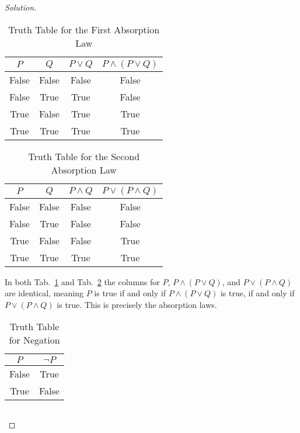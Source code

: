 \documentclass{article}
\theoremstyle{normal}
\begin{document}
\begin{proof}[Solution]
\begin{table}[H]
            \centering
            \begin{tabular}{ c | c | c | c }
                $P$&$Q$&$P\lor{Q}$&$P\land(P\lor{Q})$\\
                \hline
                False&False&False&False\\
                False&True&True&False\\
                True&False&True&True\\
                True&True&True&True
            \end{tabular}
            \caption{Truth Table for the First Absorption Law}
            \label{tab:first_abs_law}
        \end{table}
        \begin{table}[H]
            \centering
            \begin{tabular}{ c | c | c | c }
                $P$&$Q$&$P\land{Q}$&$P\lor(P\land{Q})$\\
                \hline
                False&False&False&False\\
                False&True&False&False\\
                True&False&False&True\\
                True&True&True&True
            \end{tabular}
            \caption{Truth Table for the Second Absorption Law}
            \label{tab:second_abs_law}
        \end{table}
        In both Tab.~\ref{tab:first_abs_law} and Tab.~\ref{tab:second_abs_law}
        the columns for $P$, $P\land(P\lor{Q})$, and $P\lor(P\land{Q})$ are
        identical, meaning $P$ is true if and only if
        $P\land(P\lor{Q})$ is true, if and only if $P\lor(P\land{Q})$ is true.
        This is precisely the absorption laws.
        \begin{table}[H]
            \centering
            \begin{tabular}{ c | c }
                $P$&$\neg{P}$\\
                \hline
                False&True\\
                True&False
            \end{tabular}
            \caption{Truth Table for Negation}
            \label{tab:negation}
        \end{table}
        \begin{table}[H]
            \centering
            \begin{tabular}{ c | c | c | c }

\end{tabular}
\end{table}
\end{proof}
\end{document}
